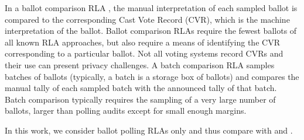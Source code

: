  In a ballot comparison RLA \cite{RLA}, the manual interpretation of each sampled ballot is compared to the corresponding Cast Vote Record (CVR), which is the machine interpretation of the ballot. Ballot comparison RLAs require the fewest ballots of all known RLA approaches, but also require a means of identifying the CVR corresponding to a particular ballot. Not all voting systems record CVRs and their use can present privacy challenges. %
A batch comparison RLA \cite{RI-report} samples batches of ballots (typically, a batch is a storage box of ballots) and compares the manual tally of each sampled batch with the announced tally of that batch. %
Batch comparison typically requires the sampling of a very large number of ballots, larger than polling audits except for small enough margins. 

In this work, we consider ballot polling RLAs only and thus compare \Providence with \BRAVO and \Minerva.
